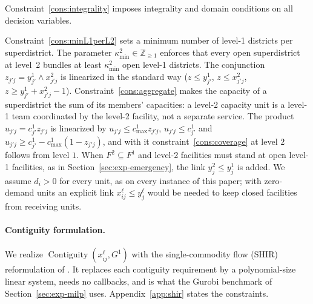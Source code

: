 \documentclass[preprint,12pt,authoryear]{elsarticle}
\theoremstyle{definition}
\DeclareMathOperator{\Contiguity}{Contiguity}  %
\begin{document}
Constraint~\eqref{cons:integrality} imposes integrality
and domain conditions on all decision variables.

Constraint~\eqref{cons:minL1perL2} sets a minimum number of level-1 districts per superdistrict. The parameter $\kappa^2_{\min} \in \mathbb{Z}_{\geq
    1}$ enforces that every open superdistrict at level~2 bundles at
    least $\kappa^2_{\min}$ open level-1 districts.  The conjunction
    $z_{j'j} = y^1_{j'} \wedge x^{2}_{j'j}$ is linearized in the
    standard way ($z \leq y^1_{j'}$, $z \leq x^2_{j'j}$,
    $z \geq y^1_{j'} + x^2_{j'j} - 1$). Constraint~\eqref{cons:aggregate} makes the capacity of a superdistrict the sum of its members' capacities: a level-2 capacity unit is a level-1 team coordinated by the level-2 facility, not a separate service. The product $u_{j'j} = c^1_{j'} z_{j'j}$ is linearized by $u_{j'j} \leq c^1_{\max} z_{j'j}$, $u_{j'j} \leq c^1_{j'}$ and $u_{j'j} \geq c^1_{j'} - c^1_{\max}(1 - z_{j'j})$, and with it constraint~\eqref{cons:coverage} at level $2$ follows from level $1$. When $F^2 \subseteq F^1$ and level-2 facilities must stand at open level-1 facilities, as in Section~\ref{sec:exp-emergency}, the link $y^2_j \leq y^1_j$ is added. We assume $d_i > 0$ for every unit, as on every instance of this paper; with zero-demand units an explicit link $x^\ell_{ij} \leq y^\ell_j$ would be needed to keep closed facilities from receiving units.


\paragraph{Contiguity formulation.}
We realize $\Contiguity(x^{\ell}_{ij}, G^1)$ with the single-commodity flow (SHIR) reformulation of \citet{shirabe2005model}. It replaces each contiguity requirement by a polynomial-size linear system, needs no callbacks, and is what the Gurobi benchmark of Section~\ref{sec:exp-milp} uses. Appendix~\ref{app:shir} states the constraints.
\end{document}
